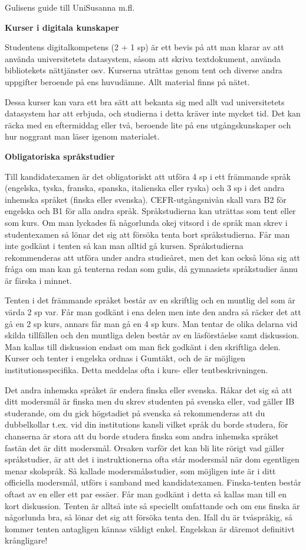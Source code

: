 \documentclass{spektraklet}
\begin{document}
\begin{artikel}{Gulisens guide till Uni}{Susanna m.fl.}
\newpage

\textbf{Kurser i digitala kunskaper}

Studentens digitalkompetens (2 + 1 sp) är ett bevis på att man klarar av att använda universitetets datasystem, såsom att skriva textdokument, använda bibliotekets nättjänster osv. Kurserna uträttas genom tent och diverse andra uppgifter beroende på ens huvudämne. Allt material finns på nätet.

Dessa kurser kan vara ett bra sätt att bekanta sig med allt vad universitetets datasystem har att erbjuda, och studierna i detta kräver inte mycket tid. Det kan räcka med en eftermiddag eller två, beroende lite på ens utgångskunskaper och hur noggrant man läser igenom materialet. 

\textbf{Obligatoriska språkstudier}

Till kandidatexamen är det obligatoriskt att utföra 4 sp i ett främmande språk (engelska, tyska, franska, spanska, italienska eller ryska) och 3 sp i det andra inhemska språket (finska eller svenska). CEFR-utgångsnivån skall vara B2 för engelska och B1 för alla andra språk. Språkstudierna kan uträttas som tent eller som kurs. 
Om man lyckades få någorlunda okej vitsord i de språk man skrev i studentexamen så lönar det sig att försöka tenta bort språkstudierna. Får man inte godkänt i tenten så kan man alltid gå kursen. Språkstudierna rekommenderas att utföra under andra studieåret, men det kan också löna sig att fråga om man kan gå tenterna redan som gulis, då gymnasiets språkstudier ännu är färska i minnet.

Tenten i det främmande språket består av en skriftlig och en muntlig del som är värda 2 sp var. Får man godkänt i ena delen men inte den andra så räcker det att gå en 2 sp kurs, annars får man gå en 4 sp kurs. Man tentar de olika delarna vid skilda tillfällen och den muntliga delen består av en läsförståelse samt diskussion. Man kallas till diskussion endast om man fick godkänt i den skriftliga delen. Kurser och tenter i engelska
ordnas i Gumtäkt, och de är möjligen institutionsspecifika. Detta meddelas ofta i kurs- eller tentbeskrivningen.

Det andra inhemska språket är endera finska eller svenska. Råkar det sig så att ditt
modersmål är finska men du skrev studenten på svenska eller, vad gäller IB studerande, om du gick högstadiet på svenska så rekommenderas att du dubbelkollar t.ex. vid din institutions kansli vilket språk du borde studera, för chanserna är stora att du borde studera finska som andra inhemska språket fastän det är ditt modersmål. Orsaken varför det kan bli lite rörigt vad gäller språkstudier, är att det i instruktionerna ofta står modersmål när dom egentligen menar skolspråk. Så kallade modersmålsstudier, som möjligen inte är i ditt officiella modersmål, utförs i samband med kandidatexamen. 
Finska-tenten består oftast av en eller ett par essäer. Får man godkänt i detta så kallas man till en kort diskussion. Tenten är alltså inte så speciellt omfattande och om ens finska är någorlunda bra, så lönar det sig att försöka tenta den. Ifall du är tvåspråkig, så kommer tenten antagligen kännas väldigt enkel. Engelskan är däremot definitivt krångligare!



\end{artikel}
\end{document}
